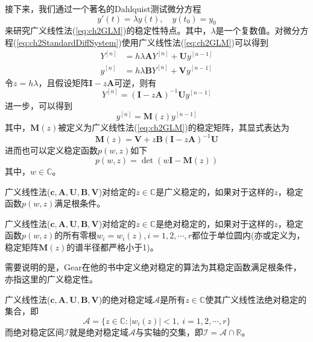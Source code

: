接下来，我们通过一个著名的Dahlquist测试微分方程
\begin{equation}
y'(t)=\lambda y(t),\quad y(t_0)=y_0\label{eq:ch2StandardDiffSystem}
\end{equation}
来研究广义线性法(\ref{eq:ch2GLM})的稳定性特点。其中，$\lambda$是一个复数值。对微分方程(\ref{eq:ch2StandardDiffSystem})使用广义线性法(\ref{eq:ch2GLM})可以得到
\begin{subequations}
\begin{align}
{Y}^{[n]}&=h\lambda\bm{A}Y^{[n]}+\bm{U}y^{[n-1]}\\
y^{[n]}&=h\lambda \bm{B}Y^{[n]}+\bm{V}y^{[n-1]}
\end{align}
\end{subequations}
令$z=h\lambda$，且假设矩阵$\bm{I}-z\bm{A}$可逆，则有
\begin{equation}
Y^{[n]}=(\bm{I}-z\bm{A})^{-1}\bm{U}y^{[n-1]}
\end{equation}
进一步，可以得到
\begin{equation}
y^{[n]}=\bm{M}(z)y^{[n-1]}
\end{equation}
其中，$\bm{M}(z)$被定义为广义线性法(\ref{eq:ch2GLM})的稳定矩阵，其显式表达为
\begin{equation}
\bm{M}(z)=\bm{V}+z\bm{B}(\bm{I}-z\bm{A})^{-1}\bm{U}
\end{equation}
进而也可以定义稳定函数$p(w,z)$如下
\begin{equation}
p(w,z)=\det(w\bm{I}-\bm{M}(z))
\end{equation}
其中，$w\in\mathbb{C}$。
\begin{definition}[广义稳定的]
广义线性法($\bm{c},\bm{A},\bm{U},\bm{B},\bm{V}$)对给定的$z\in\mathbb{C}$是广义稳定的\cite{李寿佛2010}，如果对于这样的$z$，稳定函数$p(w,z)$满足根条件。
\end{definition}%
\begin{definition}[绝对稳定性]
广义线性法($\bm{c},\bm{A},\bm{U},\bm{B},\bm{V}$)对给定的$z\in\mathbb{C}$是绝对稳定的\cite{Jackiewicz2009,李寿佛2010}，如果对于这样的$z$，稳定函数$p(w,z)$的所有零根$w_i=w_i(z),i=1,2,\cdots,r$都位于单位圆内(亦或定义为，稳定矩阵$\bm{M}(z)$的谱半径都严格小于1)。
\end{definition}%

需要说明的是，Gear在他的书中定义绝对稳定的算法为其稳定函数满足根条件，亦指这里的广义稳定性。
\begin{definition}[绝对稳定域/区间]
广义线性法($\bm{c},\bm{A},\bm{U},\bm{B},\bm{V}$)的绝对稳定域$\mathcal{A}$是所有$z\in\mathbb{C}$使其广义线性法绝对稳定的集合，即
\begin{equation}
\mathcal{A}=\{z\in\mathbb{C}:|w_i(z)|<1,\ i=1,2,\cdots,r\}
\end{equation}
而绝对稳定区间$\mathcal{I}$就是绝对稳定域$\mathcal{A}$与实轴的交集，即$\mathcal{I}=\mathcal{A}\cap\mathbb{R}$。
\end{definition}

